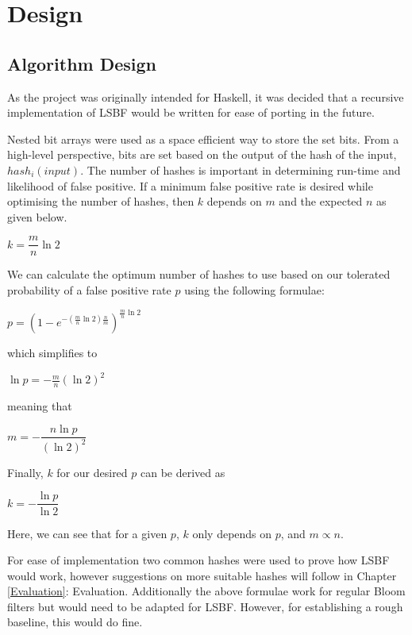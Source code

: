 \chapter{Design}

\section{Algorithm Design}
As the project was originally intended for Haskell, it was decided that a recursive implementation of LSBF would be written for ease of porting in the future.

Nested bit arrays were used as a space efficient way to store the set bits. From a high-level perspective, bits are set based on the output of the hash of the input, $hash_i(input)$. The number of hashes is important in determining run-time and likelihood of false positive. If a minimum false positive rate is desired while optimising the number of hashes, then $k$ depends on $m$ and the expected $n$ as given below.\cite{ProbabilityAndComputing}
\begin{center}
	$ k = \dfrac{m}{n}\ln 2 $
\end{center}
We can calculate the optimum number of hashes to use based on our tolerated probability of a false positive rate $p$ using the following formulae:\cite{1195150}

\begin{center}
	$p=\left( 1-e^{-(\frac{m}{n}\ln 2)\frac{n}{m}} \right)^{\frac{m}{n}\ln 2} $
\end{center}

which simplifies to

\begin{center}
$\ln p = -\frac{m}{n}(\ln 2)^2$
\end{center}

meaning that

\begin{center}
$m = -\dfrac{n\ln p}{(\ln 2)^2}$
\end{center}

Finally, $k$ for our desired $p$ can be derived as

\begin{center}
	$k = -\dfrac{\ln p}{\ln 2}$
\end{center}

Here, we can see that for a given $p$, $k$ only depends on $p$, and $m \propto n$.

For ease of implementation two common hashes were used to prove how LSBF would work, however suggestions on more suitable hashes will follow in Chapter \ref{Evaluation}: Evaluation. Additionally the above formulae work for regular Bloom filters but would need to be adapted for LSBF. However, for establishing a rough baseline, this would do fine.

